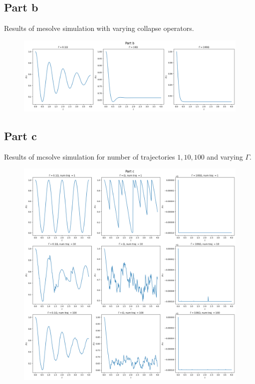 \subsection*{Part b}
Results of mesolve simulation with varying collapse operators.
\begin{figure}[H]
    \centering
    \includegraphics[width=1\linewidth]{Resources//245//Homework 9/245 Homework 9 Problem 5b.png}
    \label{fig:enter-label}
\end{figure}
\subsection*{Part c}
Results of mcsolve simulation for number of trajectories $1, 10, 100$ and varying $\Gamma$.
\begin{figure}[H]
    \centering
    \includegraphics[width=1\linewidth]{Resources//245//Homework 9/245 Homework 9 Problem 5c.png}
    \label{fig:enter-label}
\end{figure}
\pagebreak

